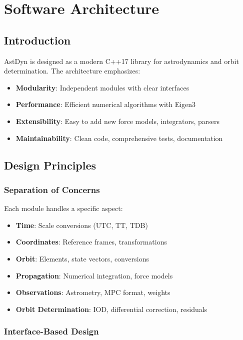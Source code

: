 \chapter{Software Architecture}
\label{ch:architecture}

\section{Introduction}

AstDyn is designed as a modern C++17 library for astrodynamics and orbit determination. The architecture emphasizes:

\begin{itemize}
    \item \textbf{Modularity}: Independent modules with clear interfaces
    \item \textbf{Performance}: Efficient numerical algorithms with Eigen3
    \item \textbf{Extensibility}: Easy to add new force models, integrators, parsers
    \item \textbf{Maintainability}: Clean code, comprehensive tests, documentation
\end{itemize}

\section{Design Principles}

\subsection{Separation of Concerns}

Each module handles a specific aspect:
\begin{itemize}
    \item \textbf{Time}: Scale conversions (UTC, TT, TDB)
    \item \textbf{Coordinates}: Reference frames, transformations
    \item \textbf{Orbit}: Elements, state vectors, conversions
    \item \textbf{Propagation}: Numerical integration, force models
    \item \textbf{Observations}: Astrometry, MPC format, weights
    \item \textbf{Orbit Determination}: IOD, differential correction, residuals
\end{itemize}

\subsection{Interface-Based Design}

